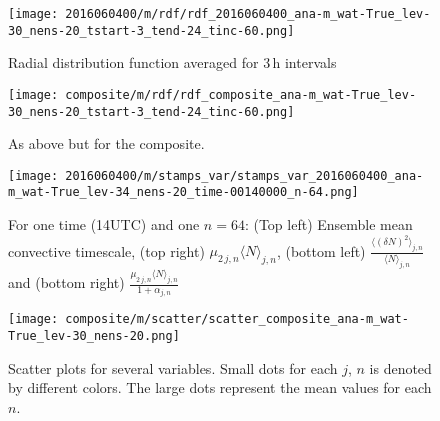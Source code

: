 \documentclass[a4paper, 12pt]{article}
\begin{document}
\begin{figure}[ht]
\noindent \centering
\texttt{[image: 2016060400/m/rdf/rdf\_2016060400\_ana-m\_wat-True\_lev-30\_nens-20\_tstart-3\_tend-24\_tinc-60.png]}\\
\caption{Radial distribution function averaged for 3\,h intervals} \label{fig:ex_rdf}
\end{figure}

\begin{figure}[ht]
\noindent \centering
\texttt{[image: composite/m/rdf/rdf\_composite\_ana-m\_wat-True\_lev-30\_nens-20\_tstart-3\_tend-24\_tinc-60.png]}\\
\caption{As above but for the composite.} \label{fig:comp_rdf}
\end{figure}

\begin{figure}[ht]
\noindent \centering
\texttt{[image: 2016060400/m/stamps\_var/stamps\_var\_2016060400\_ana-m\_wat-True\_lev-34\_nens-20\_time-00140000\_n-64.png]}\\
\caption{For one time (14UTC) and one $n=64$: (Top left) Ensemble mean convective timescale, (top right) $\mu_{2\,j,n}\langle N \rangle_{j,n}$, (bottom left) $\frac{\langle (\delta N)^2 \rangle_{j,n}}{\langle N \rangle_{j,n}}$ and (bottom right) $\frac{\mu_{2\,j,n}\langle N\rangle_{j,n}}{1 + \alpha_{j,n}}$} \label{fig:ex_stamps_var}
\end{figure}


\begin{figure}[ht]
\noindent \centering
\texttt{[image: composite/m/scatter/scatter\_composite\_ana-m\_wat-True\_lev-30\_nens-20.png]}\\
\caption{Scatter plots for several variables. Small dots for each $j$, $n$ is denoted by different colors. The large dots represent the mean values for each $n$.} \label{fig:comp_scatter}
\end{figure}
\end{document}
